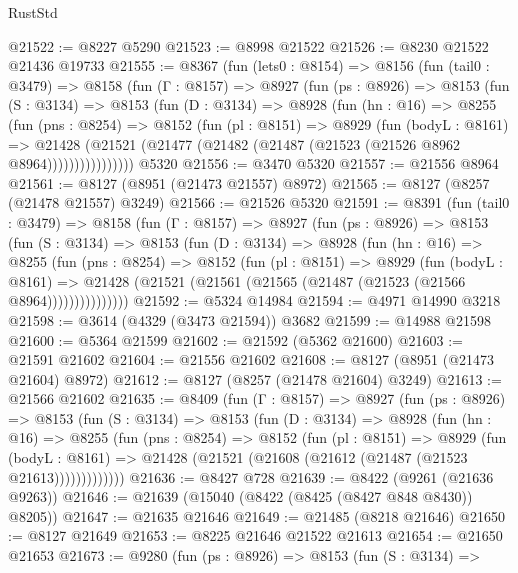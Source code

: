 \begin{lexlean}{RustStd}
\begin{coremodule}
@21522 := @8227 @5290
@21523 := @8998 @21522
@21526 := @8230 @21522 @21436 @19733
@21555 := @8367
    (fun (lets0 : @8154) =>
    @8156
      (fun (tail0 : @3479) =>
      @8158
        (fun (Γ : @8157) =>
        @8927
          (fun (ps : @8926) =>
          @8153
            (fun (S : @3134) =>
            @8153
              (fun (D : @3134) =>
              @8928
                (fun (hn : @16) =>
                @8255
                  (fun (pns : @8254) =>
                  @8152
                    (fun (pl : @8151) =>
                    @8929
                      (fun (bodyL : @8161) =>
                      @21428
                        (@21521 (@21477 (@21482 (@21487 (@21523 (@21526 @8962 @8964))))))))))))))))
    @5320
@21556 := @3470 @5320
@21557 := @21556 @8964
@21561 := @8127 (@8951 (@21473 @21557) @8972)
@21565 := @8127 (@8257 (@21478 @21557) @3249)
@21566 := @21526 @5320
@21591 := @8391
    (fun (tail0 : @3479) =>
    @8158
      (fun (Γ : @8157) =>
      @8927
        (fun (ps : @8926) =>
        @8153
          (fun (S : @3134) =>
          @8153
            (fun (D : @3134) =>
            @8928
              (fun (hn : @16) =>
              @8255
                (fun (pns : @8254) =>
                @8152
                  (fun (pl : @8151) =>
                  @8929
                    (fun (bodyL : @8161) =>
                    @21428 (@21521 (@21561 (@21565 (@21487 (@21523 (@21566 @8964)))))))))))))))
@21592 := @5324 @14984
@21594 := @4971 @14990 @3218
@21598 := @3614 (@4329 (@3473 @21594)) @3682
@21599 := @14988 @21598
@21600 := @5364 @21599
@21602 := @21592 (@5362 @21600)
@21603 := @21591 @21602
@21604 := @21556 @21602
@21608 := @8127 (@8951 (@21473 @21604) @8972)
@21612 := @8127 (@8257 (@21478 @21604) @3249)
@21613 := @21566 @21602
@21635 := @8409
    (fun (Γ : @8157) =>
    @8927
      (fun (ps : @8926) =>
      @8153
        (fun (S : @3134) =>
        @8153
          (fun (D : @3134) =>
          @8928
            (fun (hn : @16) =>
            @8255
              (fun (pns : @8254) =>
              @8152
                (fun (pl : @8151) =>
                @8929
                  (fun (bodyL : @8161) =>
                  @21428 (@21521 (@21608 (@21612 (@21487 (@21523 @21613)))))))))))))
@21636 := @8427 @728
@21639 := @8422 (@9261 (@21636 @9263))
@21646 := @21639 (@15040 (@8422 (@8425 (@8427 @848 @8430)) @8205))
@21647 := @21635 @21646
@21649 := @21485 (@8218 @21646)
@21650 := @8127 @21649
@21653 := @8225 @21646 @21522 @21613
@21654 := @21650 @21653
@21673 := @9280
    (fun (ps : @8926) =>
    @8153
      (fun (S : @3134) =>

\end{coremodule}
\end{lexlean}
